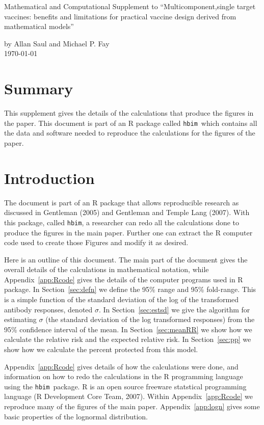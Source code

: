 \documentclass{article}[12pt]
\newcommand{\pname}{\texttt{hbim}}
\begin{document}
\baselineskip 24pt




{\Large Mathematical and Computational Supplement to 
``Multicomponent,single target vaccines: benefits and limitations 
for practical vaccine design derived from mathematical models''}

by Allan Saul and Michael P. Fay \\
\today



\section*{Summary}


This supplement gives the details of the calculations that produce 
the figures in the paper.  This document is part of an R package 
called \pname\ which contains all the data and software needed to 
reproduce the calculations for the figures of the paper.

\section{Introduction}




The document is part of an R package that allows reproducible 
research as discussed in Gentleman (2005) and Gentleman and Temple 
Lang (2007). With this package, called \pname , a researcher can 
redo all the calculations done to produce the figures in the main 
paper. Further one can extract the R computer code used to create 
those Figures and modify it as desired. 

Here is an outline of this document. The main part of the document gives the overall
details of the calculations in mathematical notation, while Appendix~\ref{app:Rcode} 
gives the details of the computer programs used in  R package.  
In Section~\ref{sec:defn} we define the 95\% range and 95\% 
fold-range. This is a simple function of the standard deviation of 
the log of the transformed antibody responses, denoted $\sigma$.  
In Section~\ref{sec:estsd} we give the algorithm for estimating 
$\sigma$ (the standard deviation of the log transformed responses)   
from the 95\% confidence interval of the mean. 
In Section~\ref{sec:meanRR} we show how we calculate the relative risk and the expected relative 
risk. In Section~\ref{sec:pp} we show how we calculate the percent protected from this model. 

Appendix~\ref{app:Rcode} gives details of how the calculations were done, and information on how to redo the calculations
in the R programming language using the \pname\ package. R is an open source freeware statstical programming language 
(R Development Core Team, 2007). Within Appendix~\ref{app:Rcode} we reproduce many of the figures of the main paper.
Appendix~\ref{app:logn} gives some basic properties of the lognormal distribution. 
\end{document}
